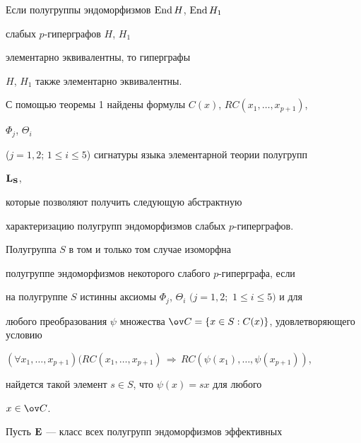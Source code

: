 \medskip 


 


\begin{prop} 


Если полугруппы эндоморфизмов $\operatorname{End} H$, $\operatorname{End} H_1$ 


слабых $p$-гиперграфов $H$, $H_1$ 


элементарно эквивалентны, то гиперграфы 


$H$, $H_1$ также элементарно эквивалентны. 


\end{prop} 


 


С помощью теоремы 1 найдены формулы $C(x)$, $RC(x_1,\dotsc,x_{p+1})$, 


$\Phi_j$, $\Theta_i$ 


($j=1,2$; $1\le i\le 5$) сигнатуры языка элементарной теории полугрупп 


$\bold L_{\bold S}$, 


которые позволяют получить следующую абстрактную 


характеризацию полугрупп эндоморфизмов слабых $p$-гиперграфов. 


 


\begin{thm} 


Полугруппа $S$ в том и только том случае изоморфна 


полугруппе эндоморфизмов некоторого слабого $p$-гиперграфа, если 


на полугруппе $S$ истинны аксиомы $\Phi_j$, $\Theta_i$ $(j=1,2;$ $1\le 


i\le 5)$ и для 


любого преобразования $\psi$ множества $\ov C=\{x\in 


S:C(x)\}$, удовлетворяющего условию 


$(\forall x_1,\dotsc,x_{p+1})(RC(x_1,\dotsc,x_{p+1})\, 


\Longrightarrow\, RC(\psi(x_1),\dotsc,\psi(x_{p+1}))$, 


найдется такой элемент $s\in S$, что $\psi(x)=s x$ для любого 


$x\in\ov C$. 


\end{thm} 


 


Пусть $\bold E$ --- класс всех полугрупп эндоморфизмов эффективных 


